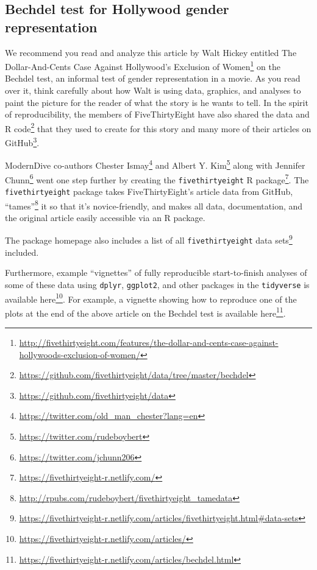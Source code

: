 \documentclass[12pt, krantz2,]{krantz}
\renewcommand{\href}[2]{#2\footnote{\url{#1}}}
\begin{document}
\hypertarget{bechdel-test-for-hollywood-gender-representation}{%
\subsection{Bechdel test for Hollywood gender representation}\label{bechdel-test-for-hollywood-gender-representation}}

We recommend you read and analyze this article by Walt Hickey entitled \href{http://fivethirtyeight.com/features/the-dollar-and-cents-case-against-hollywoods-exclusion-of-women/}{The Dollar-And-Cents Case Against Hollywood's Exclusion of Women} on the Bechdel test, an informal test of gender representation in a movie. As you read over it, think carefully about how Walt is using data, graphics, and analyses to paint the picture for the reader of what the story is he wants to tell. In the spirit of reproducibility, the members of FiveThirtyEight have also shared the \href{https://github.com/fivethirtyeight/data/tree/master/bechdel}{data and R code} that they used to create for this story and many more of their articles on \href{https://github.com/fivethirtyeight/data}{GitHub}.

ModernDive co-authors \href{https://twitter.com/old_man_chester?lang=en}{Chester Ismay} and \href{https://twitter.com/rudeboybert}{Albert Y. Kim} along with \href{https://twitter.com/jchunn206}{Jennifer Chunn} went one step further by creating the \href{https://fivethirtyeight-r.netlify.com/}{\texttt{fivethirtyeight} R package}. The \texttt{fivethirtyeight} package takes FiveThirtyEight's article data from GitHub, \href{http://rpubs.com/rudeboybert/fivethirtyeight_tamedata}{``tames''} it so that it's novice-friendly, and makes all data, documentation, and the original article easily accessible via an R package.

The package homepage also includes a list of \href{https://fivethirtyeight-r.netlify.com/articles/fivethirtyeight.html\#data-sets}{all \texttt{fivethirtyeight} data sets} included.

Furthermore, example ``vignettes'' of fully reproducible start-to-finish analyses of some of these data using \texttt{dplyr}, \texttt{ggplot2}, and other packages in the \texttt{tidyverse} is available \href{https://fivethirtyeight-r.netlify.com/articles/}{here}. For example, a vignette showing how to reproduce one of the plots at the end of the above article on the Bechdel test is available \href{https://fivethirtyeight-r.netlify.com/articles/bechdel.html}{here}.
\end{document}
